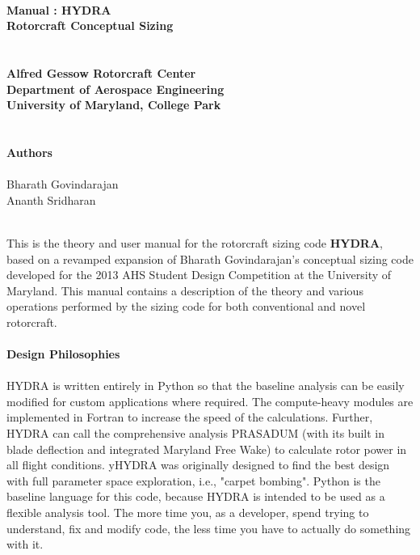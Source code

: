 
\thispagestyle{empty}
\hbox{\ }
\vspace{1in}
\renewcommand{\baselinestretch}{1}
\small\normalsize
\begin{center}

\large{{\textbf{Manual : HYDRA}}}\\
\textbf{Rotorcraft Conceptual Sizing}\\
\ \\
\large{ }
\ \\
\textbf{Alfred Gessow Rotorcraft Center} \\
\textbf{Department of Aerospace Engineering} \\
\textbf{University of Maryland, College Park}\\
\ \\
\ \\
\textbf{Authors}
\ \\
\ \\
Bharath Govindarajan \\
Ananth Sridharan \\
\textbf{} \\
\end{center}
\noindent
This is the theory and user manual for the rotorcraft sizing code \textbf{HYDRA}, based on a revamped expansion of Bharath Govindarajan's conceptual sizing code developed for the 2013 AHS  Student Design Competition at the University of Maryland. This manual contains a description of the theory and various operations performed by the sizing code for both conventional and novel rotorcraft.
\\
\\
\large{\textbf{Design Philosophies }} \\
\normalsize
\\
HYDRA is written entirely in Python so that the baseline analysis can be easily modified for custom applications where required. The compute-heavy modules are implemented in Fortran to increase the speed of the calculations. Further, HYDRA can call the comprehensive analysis PRASADUM (with its built in blade deflection and integrated Maryland Free Wake) to calculate rotor power in all flight conditions. yHYDRA was originally designed to find the best design with full parameter space exploration, i.e., "carpet bombing". Python is the baseline language for this code, because HYDRA is intended to be used as a flexible analysis tool. The more time you, as a developer, spend trying to understand, fix and modify code, the less time you have to actually do something with it.
